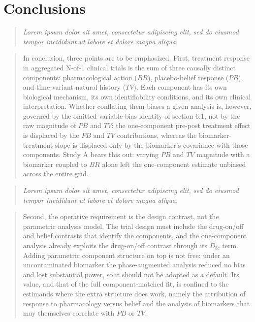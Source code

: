 \documentclass[
  11pt,
]{article}
\newenvironment{rgt}{%
  \begin{quote}\small\itshape\color[RGB]{20,60,160}}{%
  \end{quote}}
\newenvironment{orig}{%
  \begin{quote}\normalsize\color[gray]{0.55}}{%
  \end{quote}}
\begin{document}
\section{Conclusions}\label{conclusions}

\begin{rgt}
Lorem ipsum dolor sit amet, consectetur adipiscing elit, sed do eiusmod tempor incididunt ut labore et dolore magna aliqua.

\end{rgt}

\begin{orig}
In conclusion, three points are to be emphasized. First,
treatment response in aggregated N-of-1 clinical trials is the
sum of three causally distinct components: pharmacological
action (\(BR\)), placebo-belief response (\(PB\)), and time-variant
natural history (\(TV\)). Each component has its own biological
mechanism, its own identifiability conditions, and its own
clinical interpretation. Whether conflating them biases a given
analysis is, however, governed by the omitted-variable-bias
identity of section 6.1, not by the raw magnitude of \(PB\) and
\(TV\): the one-component pre-post treatment effect is displaced by the
\(PB\) and \(TV\) contributions, whereas the biomarker-treatment
slope is displaced only by the biomarker's covariance with those
components. Study A bears this out: varying \(PB\) and \(TV\) magnitude
with a biomarker coupled to \(BR\) alone left the one-component
estimate unbiased across the entire grid.

\end{orig}

\begin{rgt}
Lorem ipsum dolor sit amet, consectetur adipiscing elit, sed do eiusmod tempor incididunt ut labore et dolore magna aliqua.

\end{rgt}

\begin{orig}
Second, the operative requirement is the design contrast, not the
parametric analysis model. The trial design must include the
drug-on/off and belief contrasts that identify the components, and
the one-component analysis already exploits the drug-on/off
contrast through its \(D_{bc}\) term. Adding parametric component
structure on top is not free: under an uncontaminated biomarker the
phase-augmented analysis reduced no bias and lost substantial
power, so it should not be adopted as a default. Its value, and
that of the full component-matched fit, is confined to the
estimands where the extra structure does work, namely the
attribution of response to pharmacology versus belief and the
analysis of biomarkers that may themselves correlate with \(PB\) or
\(TV\).

\end{orig}
\end{document}
